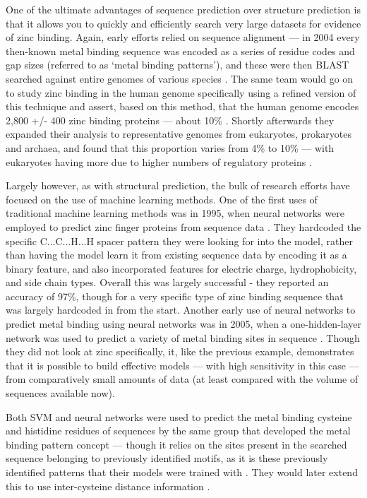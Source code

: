 One of the ultimate advantages of sequence prediction over structure prediction is that it allows you to quickly and efficiently search very large datasets for evidence of zinc binding. Again, early efforts relied on sequence alignment --- in 2004 every then-known metal binding sequence was encoded as a series of residue codes and gap sizes (referred to as `metal binding patterns'), and these were then BLAST searched against entire genomes of various species \cite{andreini2004hint}. The same team would go on to study zinc binding in the human genome specifically using a refined version of this technique and assert, based on this method, that the human genome encodes 2,800 +/- 400 zinc binding proteins --- about 10\% \cite{andreini2006counting}. Shortly afterwards they expanded their analysis to representative genomes from eukaryotes, prokaryotes and archaea, and found that this proportion varies from 4\% to 10\% --- with eukaryotes having more due to higher numbers of regulatory proteins \cite{passerini2007predicting}.

Largely however, as with structural prediction, the bulk of research efforts have focused on the use of machine learning methods. One of the first uses of traditional machine learning methods was in 1995, when neural networks were employed to predict zinc finger proteins from sequence data \cite{nakata1995prediction}. They hardcoded the specific C...C...H...H spacer pattern they were looking for into the model, rather than having the model learn it from existing sequence data by encoding it as a binary feature, and also incorporated features for electric charge, hydrophobicity, and side chain types. Overall this was largely successful - they reported an accuracy of 97\%, though for a very specific type of zinc binding sequence that was largely hardcoded in from the start. Another early use of neural networks to predict metal binding using neural networks was in 2005, when a one-hidden-layer network was used to predict a variety of metal binding sites in sequence \cite{lin2005protein}. Though they did not look at zinc specifically, it, like the previous example, demonstrates that it is possible to build effective models --- with high sensitivity in this case --- from comparatively small amounts of data (at least compared with the volume of sequences available now).

Both SVM and neural networks were used to predict the metal binding cysteine and histidine residues of sequences by the same group that developed the metal binding pattern concept --- though it relies on the sites present in the searched sequence belonging to previously identified motifs, as it is these previously identified patterns that their models were trained with \cite{passerini2006identifying}. They would later extend this to use inter-cysteine distance information \cite{passerini2007predicting}.

